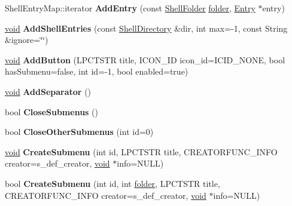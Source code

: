 \begin{DoxyCompactItemize}
Shell\+Entry\+Map\+::iterator {\bfseries Add\+Entry} (const \hyperlink{struct_shell_folder}{Shell\+Folder} \hyperlink{structfolder}{folder}, \hyperlink{struct_entry}{Entry} $\ast$entry)
\item 
\mbox{\label{struct_start_menu_a72237a844a98246d7d0977847d056cc3}} 
\hyperlink{interfacevoid}{void} {\bfseries Add\+Shell\+Entries} (const \hyperlink{struct_shell_directory}{Shell\+Directory} \&dir, int max=-\/1, const String \&ignore=\char`\"{}\char`\"{})
\item 
\mbox{\label{struct_start_menu_a8bccdece1fb4a2e026532e70c21cb6e0}} 
\hyperlink{interfacevoid}{void} {\bfseries Add\+Button} (L\+P\+C\+T\+S\+TR title, I\+C\+O\+N\+\_\+\+ID icon\+\_\+id=I\+C\+I\+D\+\_\+\+N\+O\+NE, bool has\+Submenu=false, int id=-\/1, bool enabled=true)
\item 
\mbox{\label{struct_start_menu_a5bcbca38c9a7270c3e759a7c1eaa5d44}} 
\hyperlink{interfacevoid}{void} {\bfseries Add\+Separator} ()
\item 
\mbox{\label{struct_start_menu_ae2171eb344d910728b834449669a4c2d}} 
bool {\bfseries Close\+Submenus} ()
\item 
\mbox{\label{struct_start_menu_a1be54bed1f865377c0f92eec9a05e121}} 
bool {\bfseries Close\+Other\+Submenus} (int id=0)
\item 
\mbox{\label{struct_start_menu_a0e32d312cd3907b18373a8d5dd4a43a2}} 
\hyperlink{interfacevoid}{void} {\bfseries Create\+Submenu} (int id, L\+P\+C\+T\+S\+TR title, C\+R\+E\+A\+T\+O\+R\+F\+U\+N\+C\+\_\+\+I\+N\+FO creator=s\+\_\+def\+\_\+creator, \hyperlink{interfacevoid}{void} $\ast$info=N\+U\+LL)
\item 
\mbox{\label{struct_start_menu_a2ac2fefdba83c5f31f6ce1d952f1d432}} 
bool {\bfseries Create\+Submenu} (int id, int \hyperlink{structfolder}{folder}, L\+P\+C\+T\+S\+TR title, C\+R\+E\+A\+T\+O\+R\+F\+U\+N\+C\+\_\+\+I\+N\+FO creator=s\+\_\+def\+\_\+creator, \hyperlink{interfacevoid}{void} $\ast$info=N\+U\+LL)
\item 
\mbox{\label{struct_start_menu_ad638075d365aae4dc45972d42a0d7f3b}} 

\end{DoxyCompactItemize}
